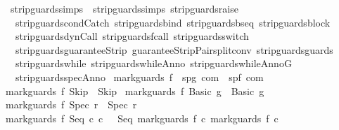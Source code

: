 \begin{isabellebody}
\isanewline
{}\isamarkupfalse%
\ strip{\isacharunderscore}guards{\isacharunderscore}simps\ {\isacharequal}\ strip{\isacharunderscore}guards{\isachardot}simps\ strip{\isacharunderscore}guards{\isacharunderscore}raise\ \isanewline
\ \ strip{\isacharunderscore}guards{\isacharunderscore}condCatch\ strip{\isacharunderscore}guards{\isacharunderscore}bind\ strip{\isacharunderscore}guards{\isacharunderscore}bseq\ strip{\isacharunderscore}guards{\isacharunderscore}block\isanewline
\ \ strip{\isacharunderscore}guards{\isacharunderscore}dynCall\ strip{\isacharunderscore}guards{\isacharunderscore}fcall\ strip{\isacharunderscore}guards{\isacharunderscore}switch\ \isanewline
\ \ strip{\isacharunderscore}guards{\isacharunderscore}guaranteeStrip\ guaranteeStripPair{\isacharunderscore}split{\isacharunderscore}conv\ strip{\isacharunderscore}guards{\isacharunderscore}guards\isanewline
\ \ strip{\isacharunderscore}guards{\isacharunderscore}while\ strip{\isacharunderscore}guards{\isacharunderscore}whileAnno\ strip{\isacharunderscore}guards{\isacharunderscore}whileAnnoG\isanewline
\ \ strip{\isacharunderscore}guards{\isacharunderscore}specAnno%
\isamarkuptrue%
\isamarkupfalse%
\ mark{\isacharunderscore}guards{\isacharcolon}{\isacharcolon}\ {\isachardoublequoteopen}{\isacharprime}f\ {\isasymRightarrow}\ {\isacharparenleft}{\isacharprime}s{\isacharcomma}{\isacharprime}p{\isacharcomma}{\isacharprime}g{\isacharparenright}\ com\ {\isasymRightarrow}\ {\isacharparenleft}{\isacharprime}s{\isacharcomma}{\isacharprime}p{\isacharcomma}{\isacharprime}f{\isacharparenright}\ com{\isachardoublequoteclose}\isanewline
{}\isanewline
{\isachardoublequoteopen}mark{\isacharunderscore}guards\ f\ Skip\ {\isacharequal}\ Skip{\isachardoublequoteclose}\ {\isacharbar}\isanewline
{\isachardoublequoteopen}mark{\isacharunderscore}guards\ f\ {\isacharparenleft}Basic\ g{\isacharparenright}\ {\isacharequal}\ Basic\ g{\isachardoublequoteclose}\ {\isacharbar}\isanewline
{\isachardoublequoteopen}mark{\isacharunderscore}guards\ f\ {\isacharparenleft}Spec\ r{\isacharparenright}\ {\isacharequal}\ Spec\ r{\isachardoublequoteclose}\ {\isacharbar}\isanewline
{\isachardoublequoteopen}mark{\isacharunderscore}guards\ f\ {\isacharparenleft}Seq\ c\ c\ \ {\isacharequal}\ {\isacharparenleft}Seq\ {\isacharparenleft}mark{\isacharunderscore}guards\ f\ c\ {\isacharparenleft}mark{\isacharunderscore}guards\ f\ c\ {\isacharbar}\isanewline

\end{isabellebody}
